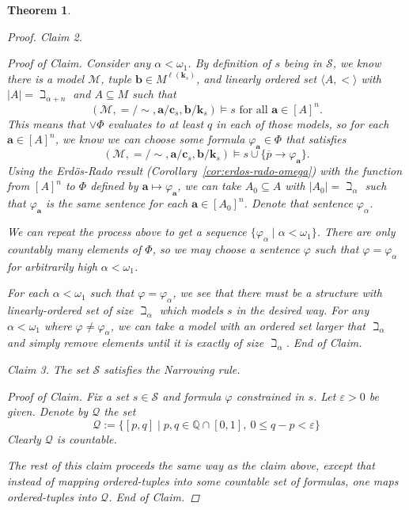 \documentclass{amsart}
\newtheorem{theorem}{Theorem}[section]
\theoremstyle{definition}
\numberwithin{equation}{theorem}
\renewcommand{\phi}{\varphi}
\renewcommand{\epsilon}{\varepsilon}
\newcommand{\Q}{\mathbb{Q}}
\newcommand{\V}{\mathbf}
\newcommand{\where}{\mid}
\newcommand{\unvee}{{\vee}}
\newcommand{\rat}[1]{{\overline{#1}}}
\newcommand{\narrow}[1]{\xrightarrow{#1}}
\renewcommand{\to}{\narrow{}}
\newcommand{\len}{\ell}
\newenvironment{claim}[1]{\vspace{.07in}\par\noindent\emph{Claim #1.}\space}{}
\newenvironment{claimproof}{\vspace{.07in}\par\noindent\emph{Proof of Claim.}\space}{\hfill \emph{End of Claim.}}
\begin{document}
\begin{theorem}
\begin{proof}
\begin{claim}{2}
\begin{claimproof}
        Consider any $\alpha<\omega_1$.
        By definition of $s$ being in $\mathscr{S}$, we know there is a model $\mathcal M$, tuple $\V b\in M^{\len(\V k_s)}$, and linearly ordered set $\langle A,<\rangle$ with $|A|=\beth_{\alpha+n}$ and $A\subseteq M$ such that
        \[
		      (\mathcal M,{=}/{\sim},\V a/\V c_s, \V b/\V k_s)\models s\text{ for all $\V a\in[A]^n$}.
		    \]
		    This means that $\unvee\Phi$ evaluates to at least $q$ in each of those models, so for each $\V a\in[A]^n$, we know we can choose some formula $\phi_{\V a}\in\Phi$ that satisfies
		    \[
		      (\mathcal M,{=}/{\sim},\V a/\V c_s, \V b/\V k_s)\models s\cup\{\rat p\to\phi_{\V a}\}.
		    \]
		    Using the Erd\"os-Rado result (Corollary~\ref{cor:erdos-rado-omega}) with the function from $[A]^n$ to $\Phi$ defined by $\V a\mapsto \phi_{\V a}$, we can take $A_0\subseteq A$ with $|A_0|=\beth_\alpha$ such that $\phi_{\V a}$ is the same sentence for each $\V a\in[A_0]^n$.
		    Denote that sentence $\phi_\alpha$.
		    
		    We can repeat the process above to get a sequence $\{\phi_\alpha\where \alpha<\omega_1\}$.
		    There are only countably many elements of $\Phi$, so we may choose a sentence $\phi$ such that $\phi=\phi_\alpha$ for arbitrarily high $\alpha<\omega_1$.
		    
		    For each $\alpha<\omega_1$ such that $\phi=\phi_\alpha$, we see that there must be a structure with linearly-ordered set of size $\beth_\alpha$ which models $s$ in the desired way.
		    For any $\alpha<\omega_1$ where $\phi\neq\phi_\alpha$, we can take a model with an ordered set larger that $\beth_\alpha$ and simply remove elements until it is exactly of size $\beth_\alpha$.
      \end{claimproof}
    \end{claim}
    \begin{claim}{3}
      The set $\mathscr{S}$ satisfies the Narrowing rule.
      \begin{claimproof}
         Fix a set $s\in \mathscr{S}$ and formula $\phi$ constrained in $s$.
         Let $\epsilon>0$ be given.
         Denote by $\mathcal Q$ the set
         \[
           \mathcal Q:=\{[p,q]\where p,q\in\Q\cap[0,1],\ 0\leq q-p<\epsilon\}
         \]
         Clearly $\mathcal Q$ is countable.
         
         The rest of this claim proceeds the same way as the claim above, except that instead of mapping ordered-tuples into some countable set of formulas, one maps ordered-tuples into $\mathcal Q$.
      \end{claimproof}
    \end{claim}
    

\end{proof}
\end{theorem}
\end{document}
